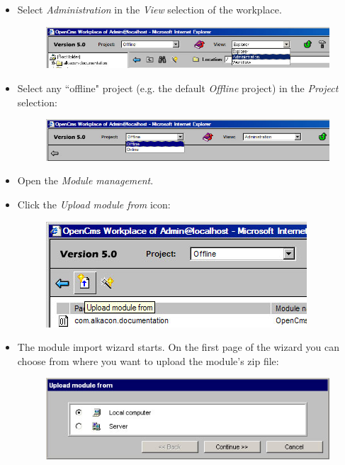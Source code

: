 \begin{itemize}

\item Select {\em Administration} in the {\em View} selection of the workplace.
\begin{figure}[hbt]
\begin{center}
\includegraphics[width=\sgw]{pics/modules/import0}
\end{center}
\end{figure}

\item Select any ``offline" project (e.g. the default {\em Offline} project) in the {\em Project} selection:
\begin{figure}[hbt]
\begin{center}
\includegraphics[width=\sgw]{pics/modules/import1}
\end{center}
\end{figure}

\item Open the {\em Module management}.

\item Click the {\em Upload module from} icon:
\begin{figure}[hbt]
\begin{center}
\includegraphics[width=\sgw]{pics/modules/import2}
\end{center}
\end{figure}

\item The module import wizard starts. On the first page of the wizard you can choose from where you want 
to upload the module's zip file:
\begin{figure}[hbt]
\begin{center}
\includegraphics[width=\sgw]{pics/modules/import3}
\end{center}
\end{figure}


\end{itemize}

